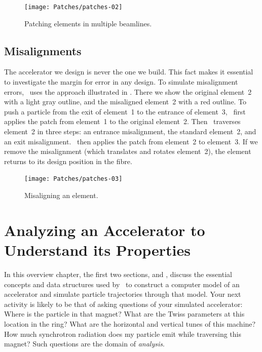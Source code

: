 \begin{figure}[ht]
  \centering
  \texttt{[image: Patches/patches-02]}
  \caption{Patching elements in multiple beamlines.}
  \label{fig:patch.recirc}
\end{figure}


\subsection{Misalignments}

%
The accelerator we design is never the one we build. This fact
makes it essential to investigate the margin for error in any
design. To simulate misalignment errors, \PTC\ uses the approach
illustrated in . There we show the original
element~2 with a light gray outline, and the misaligned element~2
with a red outline. To push a particle from the exit of element~1
to the entrance of element~3, \PTC\ first applies the patch from
element~1 to the original element~2. Then \PTC\ traverses element~2
in three steps: an entrance misalignment, the standard element~2,
and an exit misalignment.
\PTC\ then applies the patch from element~2 to element~3.
If we remove the misalignment (which translates and rotates element~2),
the element returns to its design position in the fibre.

\begin{figure}[ht]%
  \centering
  \texttt{[image: Patches/patches-03]}
  \caption{Misaligning an element.}
  \label{fig:misalignment}
\end{figure}


\section{Analyzing an Accelerator to Understand its Properties}
\label{sec:analyze.accel.prop}

%
In this overview chapter, the first two sections,
 and , discuss
the essential concepts and data structures used by \PTC\ to
construct a computer model of an accelerator and simulate particle
trajectories through that model. Your next activity is likely to
be that of asking questions of your simulated accelerator: Where
is the particle in that magnet? What are the Twiss parameters at
this location in the ring? What are the horizontal and vertical
tunes of this machine? How much synchrotron radiation does my
particle emit while traversing this magnet? Such questions are
the domain of \emph{analysis}.

